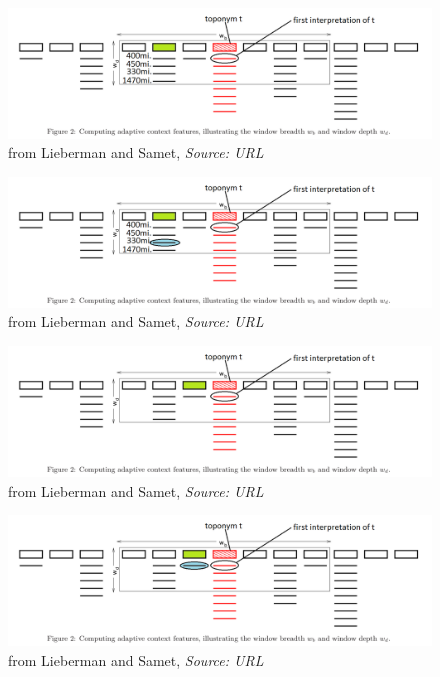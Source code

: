 \documentclass{beamer}
\begin{document}
{\begin{overprint}
		\begin{figure}
			\includegraphics[width=\textwidth]{adaptive-proximity-h.png} 
			\caption{from Lieberman and Samet, \textit{Source: URL}}
		\end{figure}
		
		\begin{figure}
			\includegraphics[width=\textwidth]{adaptive-proximity-i.png} 
			\caption{from Lieberman and Samet, \textit{Source: URL}}
		\end{figure}
		
		\begin{figure}
			\includegraphics[width=\textwidth]{adaptive-proximity-j.png} 
			\caption{from Lieberman and Samet, \textit{Source: URL}}
		\end{figure}
		
		\begin{figure}
			\includegraphics[width=\textwidth]{adaptive-proximity-j1.png} 
			\caption{from Lieberman and Samet, \textit{Source: URL}}
		\end{figure}
		

\end{overprint}}
\end{document}
